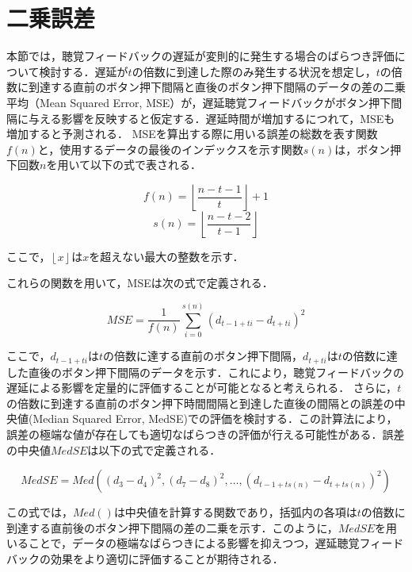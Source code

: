 \section{二乗誤差}
本節では，聴覚フィードバックの遅延が変則的に発生する場合のばらつき評価について検討する．遅延が$t$の倍数に到達した際のみ発生する状況を想定し，$t$の倍数に到達する直前のボタン押下間隔と直後のボタン押下間隔のデータの差の二乗平均（Mean Squared Error, MSE）が，遅延聴覚フィードバックがボタン押下間隔に与える影響を反映すると仮定する．遅延時間が増加するにつれて，MSEも増加すると予測される．
MSEを算出する際に用いる誤差の総数を表す関数$f(n)$と，使用するデータの最後のインデックスを示す関数$s(n)$は，ボタン押下回数$n$を用いて以下の式で表される．

\begin{equation}
f(n) = \left\lfloor \frac{n-t-1}{t} \right\rfloor + 1
\end{equation}
\begin{equation}
s(n) = \left\lfloor \frac{n-t-2}{t-1} \right\rfloor
\end{equation}

ここで，$\left\lfloor x \right\rfloor$は$x$を超えない最大の整数を示す．

これらの関数を用いて，MSEは次の式で定義される．

\begin{equation}
MSE = \frac{1}{f(n)} \sum_{i=0}^{s(n)} (d_{t-1+ti} - d_{t+ti})^2
\end{equation}

ここで，$d_{t-1+ti}$は$t$の倍数に達する直前のボタン押下間隔，$d_{t+ti}$は$t$の倍数に達した直後のボタン押下間隔のデータを示す．これにより，聴覚フィードバックの遅延による影響を定量的に評価することが可能となると考えられる．
さらに，$t$の倍数に到達する直前のボタン押下時間間隔と到達した直後の間隔との誤差の中央値(Median Squared Error, MedSE)での評価を検討する．この計算法により，誤差の極端な値が存在しても適切なばらつきの評価が行える可能性がある．誤差の中央値$MedSE$は以下の式で定義される．

\begin{equation}
MedSE = Med((d_{3}-d_{4})^2, (d_{7}-d_{8})^2, \ldots, (d_{t-1+ts(n)}-d_{t+ts(n)})^2)
\end{equation}

この式では，$Med()$は中央値を計算する関数であり，括弧内の各項は$t$の倍数に到達する直前後のボタン押下間隔の差の二乗を示す．このように，$MedSE$を用いることで，データの極端なばらつきによる影響を抑えつつ，遅延聴覚フィードバックの効果をより適切に評価することが期待される．

